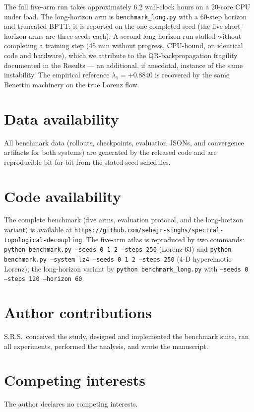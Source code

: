 \documentclass[journal]{IEEEtran}
\begin{document}
The full five-arm run takes approximately 6.2 wall-clock hours on a
20-core CPU under load. The long-horizon arm is
\texttt{benchmark\_long.py} with a 60-step horizon and truncated BPTT;
it is reported on the one completed seed (the five short-horizon arms
are three seeds each). A second long-horizon run stalled without
completing a training step (45 min without progress, CPU-bound, on
identical code and hardware), which we attribute to the
QR-backpropagation fragility documented in the Results --- an
additional, if anecdotal, instance of the same instability. The
empirical reference $\lambda_1=+0.8840$ is recovered by the same
Benettin machinery on the true Lorenz flow.

\section*{Data availability}
\begin{sloppypar}
All benchmark data (rollouts, checkpoints, evaluation JSONs, and
convergence artifacts for both systems) are generated by the released
code and are reproducible bit-for-bit from the stated seed schedules.
\end{sloppypar}

\section*{Code availability}
\begin{sloppypar}
The complete benchmark (five arms, evaluation protocol, and the
long-horizon variant) is available at
\texttt{https://github.com/sehajr-singhs/spectral-topological-decoupling}.
The five-arm atlas is reproduced by two commands: \texttt{python
benchmark.py --seeds 0 1 2 --steps 250} (Lorenz-63) and
\texttt{python benchmark.py --system lz4 --seeds 0 1 2 --steps
250} (4-D hyperchaotic Lorenz); the long-horizon variant by
\texttt{python benchmark\_long.py} with \texttt{--seeds 0 --steps
120 --horizon 60}.
\end{sloppypar}

\section*{Author contributions}
S.R.S.\ conceived the study, designed and implemented the benchmark
suite, ran all experiments, performed the analysis, and wrote the
manuscript.

\section*{Competing interests}
The author declares no competing interests.
\end{document}
